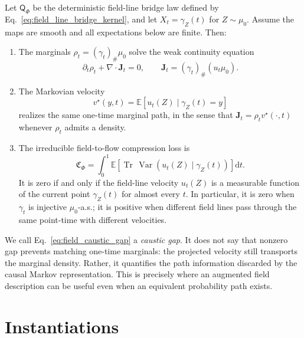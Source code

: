 \documentclass[twoside,11pt]{jmlr}
\numberwithin{equation}{section}
\newcommand{\E}{\mathbb{E}}
\newcommand{\dd}{\mathrm{d}}
\newcommand{\scrQ}{\mathsf{Q}}
\newcommand{\J}{\bm J}
\newcommand{\Var}{\operatorname{Var}}
\newcommand{\Tr}{\operatorname{Tr}}
\begin{document}
\begin{theorem}
Let $\scrQ_\Phi$ be the deterministic field-line bridge law defined by Eq.~\eqref{eq:field_line_bridge_kernel}, and let $X_t=\gamma_Z(t)$ for $Z\sim\mu_0$. Assume the maps are smooth and all expectations below are finite. Then:
\begin{enumerate}[leftmargin=2em]
    \item The marginals $\rho_t=(\gamma_t)_\#\mu_0$ solve the weak continuity equation
    \begin{equation}
        \partial_t\rho_t+\nabla\cdot \J_t=0,
        \qquad
        \J_t=(\gamma_t)_\#(u_t\mu_0).
    \end{equation}
    \item The Markovian velocity
    \begin{equation}
        v^\star(y,t)=\E[u_t(Z)\mid \gamma_Z(t)=y]
    \end{equation}
    realizes the same one-time marginal path, in the sense that $\J_t=\rho_t v^\star(\cdot,t)$ whenever $\rho_t$ admits a density.
    \item The irreducible field-to-flow compression loss is
    \begin{equation}
        \mathfrak C_\Phi
        =\int_0^1\E\left[\Tr\,\Var(u_t(Z)\mid \gamma_Z(t))\right]\dd t.
        \label{eq:field_caustic_gap}
    \end{equation}
    It is zero if and only if the field-line velocity $u_t(Z)$ is a measurable function of the current point $\gamma_Z(t)$ for almost every $t$. In particular, it is zero when $\gamma_t$ is injective $\mu_0$-a.s.; it is positive when different field lines pass through the same point-time with different velocities.
\end{enumerate}
\end{theorem}

We call Eq.~\eqref{eq:field_caustic_gap} a \emph{caustic gap}. It does not say that nonzero gap prevents matching one-time marginals: the projected velocity still transports the marginal density. Rather, it quantifies the path information discarded by the causal Markov representation. This is precisely where an augmented field description can be useful even when an equivalent probability path exists.

\section{Instantiations}
\end{document}

